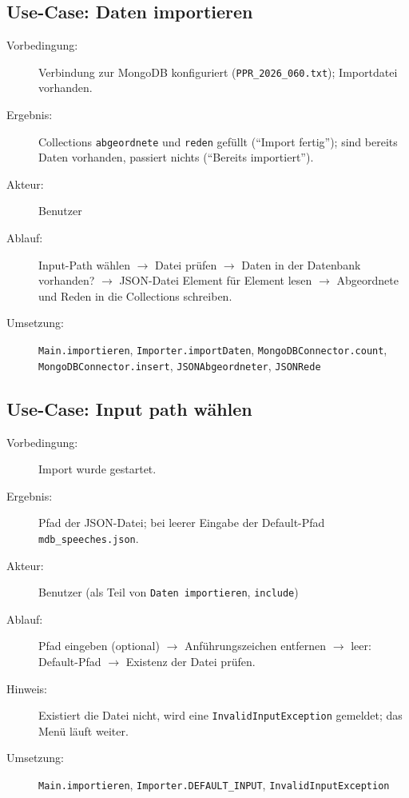 
\subsection{Use-Case: Daten importieren}
\begin{description}
    \item[Vorbedingung:] Verbindung zur MongoDB konfiguriert (\texttt{PPR\_2026\_060.txt}); Importdatei vorhanden.
    \item[Ergebnis:] Collections \texttt{abgeordnete} und \texttt{reden} gefüllt (\enquote{Import fertig}); sind bereits Daten vorhanden, passiert nichts (\enquote{Bereits importiert}).
    \item[Akteur:] Benutzer
    \item[Ablauf:] Input-Path wählen $\rightarrow$ Datei prüfen $\rightarrow$ Daten in der Datenbank vorhanden? $\rightarrow$ JSON-Datei Element für Element lesen $\rightarrow$ Abgeordnete und Reden in die Collections schreiben.
    \item[Umsetzung:] \texttt{Main.importieren}, \texttt{Importer.importDaten}, \texttt{MongoDBConnector.count}, \texttt{MongoDBConnector.insert}, \texttt{JSONAbgeordneter}, \texttt{JSONRede}
\end{description}

\subsection{Use-Case: Input path wählen}
\begin{description}
    \item[Vorbedingung:] Import wurde gestartet.
    \item[Ergebnis:] Pfad der JSON-Datei; bei leerer Eingabe der Default-Pfad \texttt{mdb\_speeches.json}.
    \item[Akteur:] Benutzer (als Teil von \texttt{Daten importieren}, \texttt{include})
    \item[Ablauf:] Pfad eingeben (optional) $\rightarrow$ Anführungszeichen entfernen $\rightarrow$ leer: Default-Pfad $\rightarrow$ Existenz der Datei prüfen.
    \item[Hinweis:] Existiert die Datei nicht, wird eine \texttt{InvalidInputException} gemeldet; das Menü läuft weiter.
    \item[Umsetzung:] \texttt{Main.importieren}, \texttt{Importer.DEFAULT\_INPUT}, \texttt{InvalidInputException}
\end{description}

